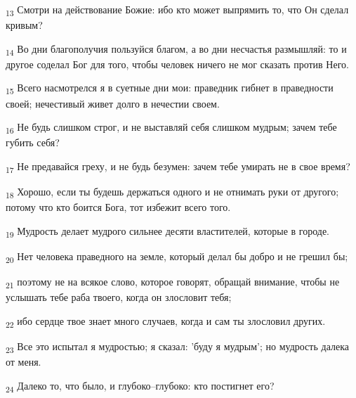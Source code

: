 \begin{tcolorbox}
\textsubscript{13} Смотри на действование Божие: ибо кто может выпрямить то, что Он сделал кривым?
\end{tcolorbox}
\begin{tcolorbox}
\textsubscript{14} Во дни благополучия пользуйся благом, а во дни несчастья размышляй: то и другое соделал Бог для того, чтобы человек ничего не мог сказать против Него.
\end{tcolorbox}
\begin{tcolorbox}
\textsubscript{15} Всего насмотрелся я в суетные дни мои: праведник гибнет в праведности своей; нечестивый живет долго в нечестии своем.
\end{tcolorbox}
\begin{tcolorbox}
\textsubscript{16} Не будь слишком строг, и не выставляй себя слишком мудрым; зачем тебе губить себя?
\end{tcolorbox}
\begin{tcolorbox}
\textsubscript{17} Не предавайся греху, и не будь безумен: зачем тебе умирать не в свое время?
\end{tcolorbox}
\begin{tcolorbox}
\textsubscript{18} Хорошо, если ты будешь держаться одного и не отнимать руки от другого; потому что кто боится Бога, тот избежит всего того.
\end{tcolorbox}
\begin{tcolorbox}
\textsubscript{19} Мудрость делает мудрого сильнее десяти властителей, которые в городе.
\end{tcolorbox}
\begin{tcolorbox}
\textsubscript{20} Нет человека праведного на земле, который делал бы добро и не грешил бы;
\end{tcolorbox}
\begin{tcolorbox}
\textsubscript{21} поэтому не на всякое слово, которое говорят, обращай внимание, чтобы не услышать тебе раба твоего, когда он злословит тебя;
\end{tcolorbox}
\begin{tcolorbox}
\textsubscript{22} ибо сердце твое знает много случаев, когда и сам ты злословил других.
\end{tcolorbox}
\begin{tcolorbox}
\textsubscript{23} Все это испытал я мудростью; я сказал: 'буду я мудрым'; но мудрость далека от меня.
\end{tcolorbox}
\begin{tcolorbox}
\textsubscript{24} Далеко то, что было, и глубоко--глубоко: кто постигнет его?
\end{tcolorbox}
